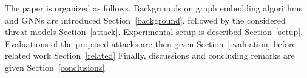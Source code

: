 The paper is organized as follows.
Backgrounds on graph embedding algorithms and GNNs are introduced Section~\ref{background}, followed by the considered threat models Section~\ref{attack}. %
Experimental setup is described Section~\ref{setup}.
Evaluations of the proposed attacks are then given Section~\ref{evaluation} before related work Section~\ref{related}
Finally, discussions and concluding remarks are given Section~\ref{conclusions}.

































